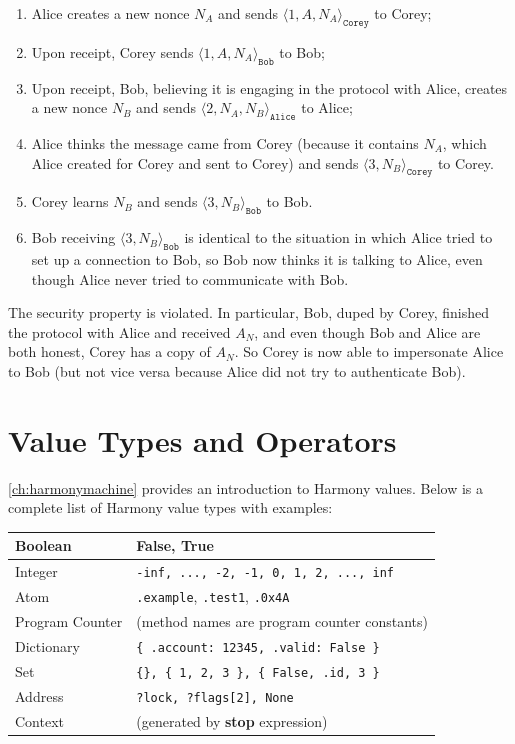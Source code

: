 \documentclass{report}
\begin{document}
\begin{enumerate}
\item Alice creates a new nonce $N_A$ and sends $\langle 1, A, N_A \rangle_\mathtt{Corey}$
to Corey;
\item Upon receipt, Corey sends $\langle 1, A, N_A \rangle_\mathtt{Bob}$ to Bob;
\item Upon receipt, Bob, believing it is engaging in the protocol with Alice,
creates a new nonce $N_B$ and sends
$\langle 2, N_A, N_B \rangle_\mathtt{Alice}$ to Alice;
\item Alice thinks the message came from Corey (because it contains $N_A$, which
Alice created for Corey and sent to Corey) and
sends $\langle 3, N_B \rangle_\mathtt{Corey}$ to Corey.
\item Corey learns $N_B$ and sends $\langle 3, N_B \rangle_\mathtt{Bob}$ to Bob.
\item Bob receiving $\langle 3, N_B \rangle_\mathtt{Bob}$ is identical to the
situation in which Alice tried to set up a connection to Bob,
so Bob now thinks it is talking to Alice, even though Alice never tried to
communicate with Bob.
\end{enumerate}
The security property is violated.  In particular, Bob, duped by Corey, finished
the protocol with Alice and received $A_N$, and even though Bob and Alice
are both honest, Corey has a copy of $A_N$.  So Corey is now able to impersonate
Alice to Bob (but not vice versa because Alice did not try to authenticate Bob).




\appendix

\chapter{Value Types and Operators}
\label{ap:values}

\autoref{ch:harmonymachine} provides an introduction to Harmony values.
Below is a complete list of Harmony value types with examples:

\vspace{1em}
\begin{tabular}{|l|l|}
\hline
Boolean & \textbf{False}, \textbf{True} \\
\hline
Integer & \texttt{-inf, ..., -2, -1, 0, 1, 2, ..., inf} \\
\hline
Atom & \texttt{.example}, \texttt{.test1}, \texttt{.0x4A} \\
\hline
Program Counter & (method names are program counter constants) \\
\hline
Dictionary & \texttt{\{ .account: 12345, .valid: False \} } \\
\hline
Set & \texttt{\{\}, \{ 1, 2, 3 \}, \{ False, .id, 3 \} } \\
\hline
Address & \texttt{?lock, ?flags[2], None} \\
\hline
Context & (generated by \textbf{stop} expression) \\
\hline
\end{tabular}
\vspace{1em}
\end{document}
